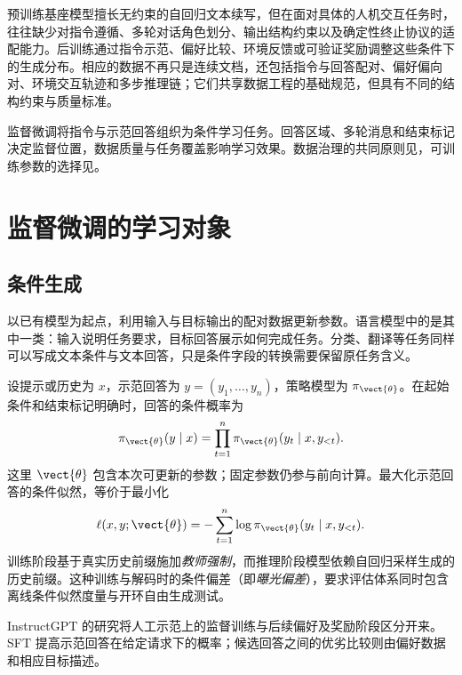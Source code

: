 \documentclass[../textbook.tex]{subfiles}
\begin{document}
\fi
{}

预训练基座模型擅长无约束的自回归文本续写，但在面对具体的人机交互任务时，往往缺少对指令遵循、多轮对话角色划分、输出结构约束以及确定性终止协议的适配能力。后训练通过指令示范、偏好比较、环境反馈或可验证奖励调整这些条件下的生成分布。相应的数据不再只是连续文档，还包括指令与回答配对、偏好偏向对、环境交互轨迹和多步推理链；它们共享数据工程的基础规范，但具有不同的结构约束与质量标准。

监督微调将指令与示范回答组织为条件学习任务。回答区域、多轮消息和结束标记决定监督位置，数据质量与任务覆盖影响学习效果。数据治理的共同原则见，可训练参数的选择见。

\section{监督微调的学习对象}

\subsection{条件生成}
以已有模型为起点，利用输入与目标输出的配对数据更新参数。语言模型中的是其中一类：输入说明任务要求，目标回答展示如何完成任务。分类、翻译等任务同样可以写成文本条件与文本回答，只是条件字段的转换需要保留原任务含义。

设提示或历史为 $x$，示范回答为 $y=(y_1,\ldots,y_n)$，策略模型为 $\pi_{\vect{\theta}}$。在起始条件和结束标记明确时，回答的条件概率为
\begin{equation}
 \pi_{\vect{\theta}}(y\mid x)=\prod_{t=1}^{n}\pi_{\vect{\theta}}(y_t\mid x,y_{<t}).
 \label{eq:sft-chain}
\end{equation}
这里 $\vect{\theta}$ 包含本次可更新的参数；固定参数仍参与前向计算。最大化示范回答的条件似然，等价于最小化
\begin{equation}
 \ell(x,y;\vect{\theta})=-\sum_{t=1}^{n}\log\pi_{\vect{\theta}}(y_t\mid x,y_{<t}).
 \label{eq:sft-sequence}
\end{equation}
训练阶段基于真实历史前缀施加\emph{教师强制}，而推理阶段模型依赖自回归采样生成的历史前缀。这种训练与解码时的条件偏差（即\emph{曝光偏差}），要求评估体系同时包含离线条件似然度量与开环自由生成测试。

InstructGPT 的研究将人工示范上的监督训练与后续偏好及奖励阶段区分开来\cite{ouyang2022instructgpt}。SFT 提高示范回答在给定请求下的概率；候选回答之间的优劣比较则由偏好数据和相应目标描述。
\end{document}
